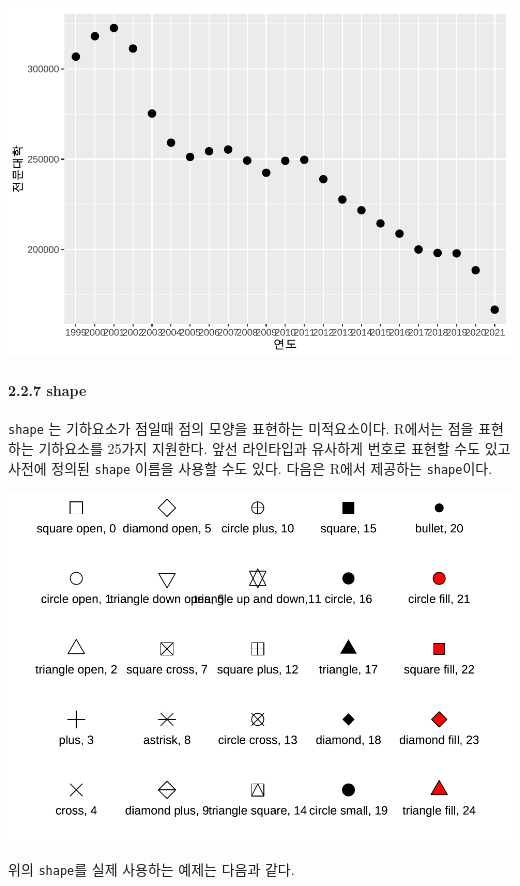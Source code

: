 \documentclass[
]{article}
\begin{document}
\includegraphics{chap3_files/figure-latex/unnamed-chunk-13-2.pdf}

\hypertarget{shape}{%
\paragraph{2.2.7 shape}\label{shape}}

\texttt{shape} 는 기하요소가 점일때 점의 모양을 표현하는 미적요소이다. R에서는 점을 표현하는 기하요소를 25가지 지원한다. 앞선 라인타입과 유사하게 번호로 표현할 수도 있고 사전에 정의된 \texttt{shape} 이름을 사용할 수도 있다. 다음은 R에서 제공하는 \texttt{shape}이다.

\includegraphics{chap3_files/figure-latex/unnamed-chunk-14-1.pdf}

위의 \texttt{shape}를 실제 사용하는 예제는 다음과 같다.
\end{document}
